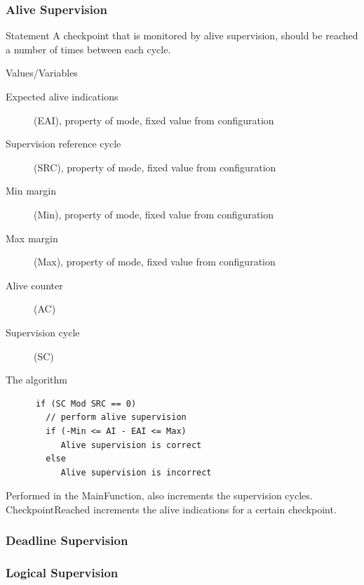\documentclass{beamer}
\begin{document}
\begin{frame}
  \frametitle{Alive Supervision}
  \begin{block}{Statement}
    A checkpoint that is monitored by alive supervision, should be
    reached a number of times between each cycle.
  \end{block}
\end{frame}

\begin{frame}
  \begin{block}{Values/Variables}
    \begin{description}
      \item[Expected alive indications] (EAI), property of mode, fixed
        value from configuration
      \item[Supervision reference cycle] (SRC), property of mode, fixed value
        from configuration
      \item[Min margin] (Min), property of mode, fixed value from configuration
      \item[Max margin] (Max), property of mode, fixed value from configuration
      \item[Alive counter] (AC)
      \item[Supervision cycle] (SC)
    \end{description}
  \end{block}
\end{frame}

\begin{frame}[fragile]
  \begin{block}{The algorithm}
    \begin{lstlisting}
      if (SC Mod SRC == 0)
        // perform alive supervision
        if (-Min <= AI - EAI <= Max)
           Alive supervision is correct
        else
           Alive supervision is incorrect
    \end{lstlisting}
  \end{block}
  Performed in the MainFunction, also increments the supervision
  cycles.\\
  CheckpointReached increments the alive indications for a certain
  checkpoint.
\end{frame}

\begin{frame}
  \frametitle{Deadline Supervision}
\end{frame}

\begin{frame}
  \frametitle{Logical Supervision}
\end{frame}
\end{document}
